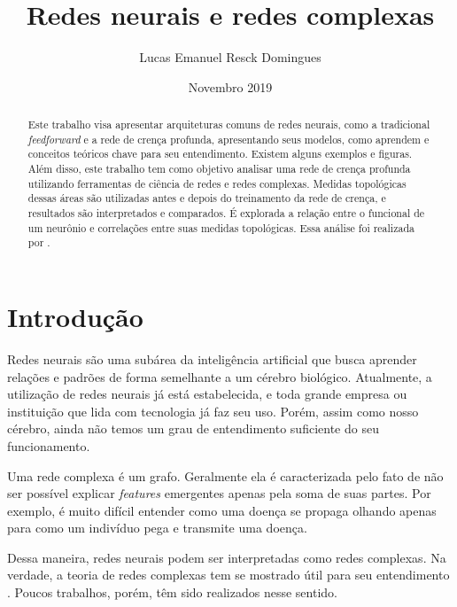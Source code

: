 \documentclass{article}
\title{Redes neurais e redes complexas}
\author{Lucas Emanuel Resck Domingues}
\date{Novembro 2019}
\begin{document}
    \maketitle

    \begin{abstract}
        Este trabalho visa apresentar arquiteturas comuns de redes neurais, como a tradicional \textit{feedforward} e a rede de crença profunda, apresentando seus modelos, como aprendem e conceitos teóricos chave para seu entendimento.
        Existem alguns exemplos e figuras.
        Além disso, este trabalho tem como objetivo analisar uma rede de crença profunda utilizando ferramentas de ciência de redes e redes complexas.
        Medidas topológicas dessas áreas são utilizadas antes e depois do treinamento da rede de crença, e resultados são interpretados e comparados.
        É explorada a relação entre o funcional de um neurônio e correlações entre suas medidas topológicas.
        Essa análise foi realizada por \cite{testolin2018deep}.
    \end{abstract}
    
    \newpage

    \tableofcontents

    \newpage

    \section{Introdução}

        Redes neurais são uma subárea da inteligência artificial que busca aprender relações e padrões de forma semelhante a um cérebro biológico.
        Atualmente, a utilização de redes neurais já está estabelecida, e toda grande empresa ou instituição que lida com tecnologia já faz seu uso.
        Porém, assim como nosso cérebro, ainda não temos um grau de entendimento suficiente do seu funcionamento.

        Uma rede complexa é um grafo.
        Geralmente ela é caracterizada pelo fato de não ser possível explicar \textit{features} emergentes apenas pela soma de suas partes.
        Por exemplo, é muito difícil entender como uma doença se propaga olhando apenas para como um indivíduo pega e transmite uma doença.
        
        Dessa maneira, redes neurais podem ser interpretadas como redes complexas.
        Na verdade, a teoria de redes complexas tem se mostrado útil para seu entendimento \cite{galhardo2006redes}.
        Poucos trabalhos, porém, têm sido realizados nesse sentido.
\end{document}
